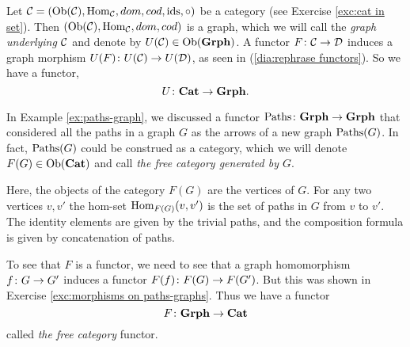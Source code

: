 \documentclass[CT4S-EN-RU]{subfiles}
\begin{document}
\begin{proofRUS}
\end{proofRUS}

\begin{exampleENG}\label{ex:underlying graph}
Let $\mathcal{C}=(\textnormal{Ob}(\mathcal{C}),\textnormal{Hom}_\mathcal{C},dom,cod,\textnormal{ids},\circ)$ be a category (see Exercise \ref{exc:cat in set}). Then $(\textnormal{Ob}(\mathcal{C}),\textnormal{Hom}_\mathcal{C},dom,cod)$ is a graph, which we will call the {\em graph underlying $\mathcal{C}$} and denote by $U(\mathcal{C})\in\textnormal{Ob}({\bf Grph})$. A functor $F\colon\mathcal{C}\rightarrow\mathcal{D}$ induces a graph morphism $U(F)\colon U(\mathcal{C})\rightarrow U(\mathcal{D})$, as seen in (\ref{dia:rephrase functors}). So we have a functor, $$U\colon{\bf Cat}\rightarrow{\bf Grph}.$$
\end{exampleENG}

\begin{exampleRUS}\label{ex:underlying graph}
\end{exampleRUS}

\begin{exampleENG}\label{ex:free category}
In Example \ref{ex:paths-graph}, we discussed a functor $\textnormal{Paths}\colon{\bf Grph}\rightarrow{\bf Grph}$ that considered all the paths in a graph $G$ as the arrows of a new graph $\textnormal{Paths}(G)$. In fact, $\textnormal{Paths}(G)$ could be construed as a category, which we will denote $F(G)\in\textnormal{Ob}({\bf Cat})$ and call {\em the free category generated by $G$}. 

Here, the objects of the category $F(G)$ are the vertices of $G$. For any two vertices $v,v'$ the hom-set $\textnormal{Hom}_{F(G)}(v,v')$ is the set of paths in $G$ from $v$ to $v'$. The identity elements are given by the trivial paths, and the composition formula is given by concatenation of paths. 

To see that $F$ is a functor, we need to see that a graph homomorphism $f\colon G\rightarrow G'$ induces a functor $F(f)\colon F(G)\rightarrow F(G')$. But this was shown in Exercise \ref{exc:morphisms on paths-graphs}. Thus we have a functor $$F\colon{\bf Grph}\rightarrow{\bf Cat}$$ called {\em the free category} functor.
\end{exampleENG}

\begin{exampleRUS}\label{ex:free category}
\end{exampleRUS}
\end{document}

